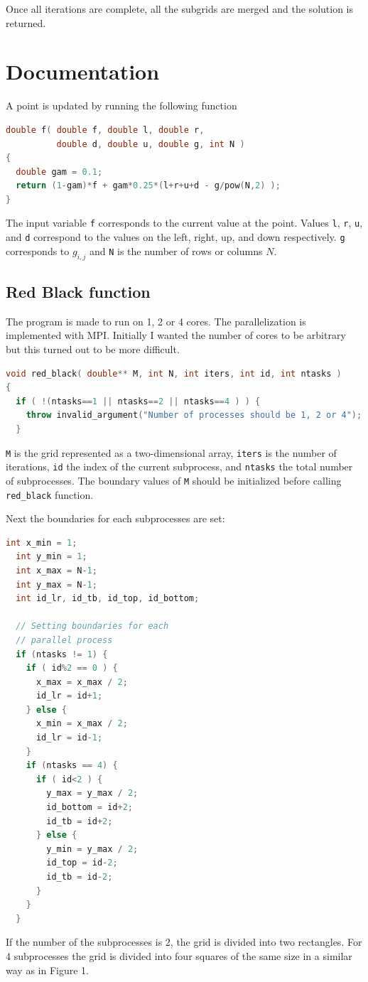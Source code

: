 \documentclass[12pt, letterpaper]{article}
\begin{document}
Once all iterations are complete, all the subgrids are merged and the solution is returned.

\section{Documentation}
A point is updated by running the following function
\begin{lstlisting}[language=C++]
double f( double f, double l, double r, 
          double d, double u, double g, int N )
{ 
  double gam = 0.1;
  return (1-gam)*f + gam*0.25*(l+r+u+d - g/pow(N,2) );
}
\end{lstlisting}
The input variable \verb|f| corresponds to the current value at the point. Values \verb|l|, \verb|r|, \verb|u|, and \verb|d| correspond to the values on the left, right, up, and down respectively.
\verb|g| corresponds to $g_{i,j}$ and \verb|N| is the number of rows or columns $N$.

\subsection{Red Black function}
The program is made to run on 1, 2 or 4 cores.
The parallelization is implemented with MPI.
Initially I wanted the number of cores to be arbitrary but this turned out to be more difficult.
\begin{lstlisting}[language=C++]
void red_black( double** M, int N, int iters, int id, int ntasks )
{
  if ( !(ntasks==1 || ntasks==2 || ntasks==4 ) ) {
    throw invalid_argument("Number of processes should be 1, 2 or 4");
  }
\end{lstlisting}
\verb|M| is the grid represented as a two-dimensional array, \verb|iters| is the number of iterations, \verb|id| the index of the current subprocess, and \verb|ntasks| the total number of subprocesses.
The boundary values of \verb|M| should be initialized before calling \verb|red_black| function.

Next the boundaries for each subprocesses are set:
\begin{lstlisting}[language=C++]
  int x_min = 1;
  int y_min = 1;
  int x_max = N-1;
  int y_max = N-1;
  int id_lr, id_tb, id_top, id_bottom;

  // Setting boundaries for each
  // parallel process
  if (ntasks != 1) {
    if ( id%2 == 0 ) {
      x_max = x_max / 2;
      id_lr = id+1;
    } else {
      x_min = x_max / 2;
      id_lr = id-1;
    }
    if (ntasks == 4) {
      if ( id<2 ) {
        y_max = y_max / 2;
        id_bottom = id+2;
        id_tb = id+2;
      } else {
        y_min = y_max / 2;
        id_top = id-2;
        id_tb = id-2;
      }
    }
  }
\end{lstlisting}
If the number of the subprocesses is 2, the grid is divided into two rectangles.
For 4 subprocesses the grid is divided into four squares of the same size in a similar way as in Figure 1.
\end{document}
